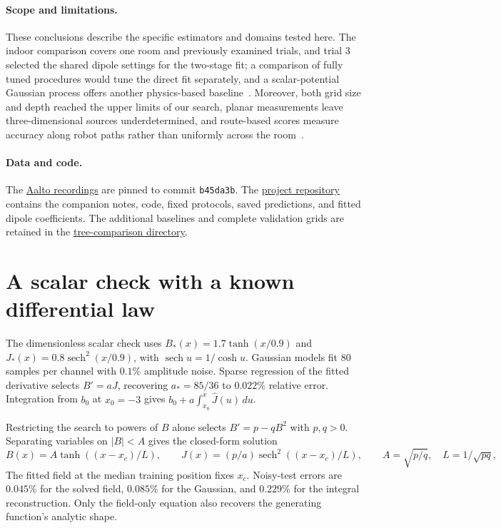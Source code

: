 \documentclass[11pt]{article}
\newcommand{\sech}{\operatorname{sech}}
\begin{document}
\paragraph{Scope and limitations.}
These conclusions describe the specific estimators and domains tested here. The
indoor comparison covers one room and previously examined trials, and trial 3
selected the shared dipole settings for the two-stage fit; a comparison of
fully tuned procedures would tune the direct fit separately, and a
scalar-potential Gaussian process offers another physics-based
baseline~\cite{solin}. Moreover, both grid size and depth reached the upper
limits of our search, planar measurements leave three-dimensional sources
underdetermined, and route-based scores measure accuracy along robot paths
rather than uniformly across the room~\cite{wadoux}.

\paragraph{Data and code.}
The \href{https://github.com/AaltoML/magnetic-data/tree/b45da3bc7ab623fdef6e01247021daebf7983f29}{Aalto recordings}
are pinned to commit \texttt{b45da3b}. The
\href{https://github.com/jonland82/blind-field-discovery/tree/52cd50c}{project repository}
contains the companion notes, code, fixed protocols, saved predictions,
and fitted dipole coefficients.
The additional baselines and complete validation grids are retained in the
\href{https://github.com/jonland82/blind-field-discovery/tree/52cd50c/experiments/magnetic_mapping/tree_comparison}{tree-comparison directory}.

\appendix
\section{A scalar check with a known differential law}
\label{sec:scalar}

The dimensionless scalar check uses \(B_*(x)=1.7\tanh(x/0.9)\) and
\(J_*(x)=0.8\sech^2(x/0.9)\), with \(\sech u=1/\cosh u\).
Gaussian models fit 80 samples per channel with \(0.1\%\) amplitude noise.
Sparse regression of the fitted derivative selects \(B'=aJ\), recovering
\(a_*=85/36\) to \(0.022\%\) relative error. Integration from \(b_0\) at
\(x_0=-3\) gives \(b_0+a\int_{x_0}^x\widehat J(u)\,du\).

Restricting the search to powers of \(B\) alone selects \(B'=p-qB^2\) with
\(p,q>0\). Separating variables on \(|B|<A\) gives the closed-form solution
\[
 B(x)=A\tanh((x-x_c)/L),\qquad J(x)=(p/a)\sech^2((x-x_c)/L),
 \qquad A=\sqrt{p/q},\quad L=1/\sqrt{pq},
\]
The fitted field at the median training position fixes \(x_c\). Noisy-test
errors are \(0.045\%\) for the solved field, \(0.085\%\) for the Gaussian,
and \(0.229\%\) for the integral reconstruction. Only the field-only equation
also recovers the generating function's analytic shape.
\end{document}
